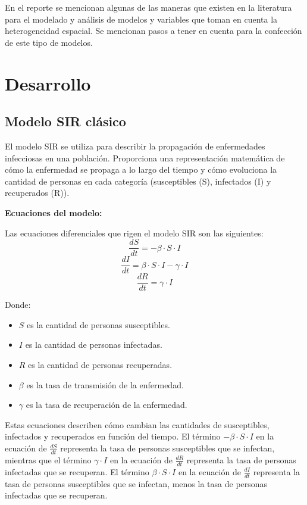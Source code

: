 \documentclass[fleqn,10pt]{SelfArx_063318} %
\begin{document}
En el reporte se mencionan algunas de las maneras que existen en la literatura para el modelado y análisis de
modelos y variables que toman en cuenta la heterogeneidad espacial. Se mencionan pasos a tener en cuenta para la 
confección de este tipo de modelos.

\section{Desarrollo}

\subsection{Modelo SIR clásico}

El modelo SIR se utiliza para describir la propagación de enfermedades infecciosas en una población.
Proporciona una representación matemática de cómo la enfermedad se propaga a lo largo del tiempo y cómo
evoluciona la cantidad de personas en cada categoría (susceptibles (S), infectados (I) y recuperados (R)).

\textbf{Ecuaciones del modelo:}

Las ecuaciones diferenciales que rigen el modelo SIR son las siguientes:
\begin{equation*}
    \frac{dS}{dt} = -\beta \cdot S \cdot I
\end{equation*}
\begin{equation*}
    \frac{dI}{dt} = \beta \cdot S \cdot I - \gamma \cdot I
\end{equation*}
\begin{equation*}
    \frac{dR}{dt} = \gamma \cdot I
\end{equation*}

Donde:
\begin{itemize}
    \item $S$ es la cantidad de personas susceptibles.
    \item $I$ es la cantidad de personas infectadas.
    \item $R$ es la cantidad de personas recuperadas.
    \item $\beta$ es la tasa de transmisión de la enfermedad.
    \item $\gamma$ es la tasa de recuperación de la enfermedad.
\end{itemize}

Estas ecuaciones describen cómo cambian las cantidades de susceptibles, infectados y recuperados en función del tiempo.
El término $-\beta \cdot S \cdot I$ en la ecuación de $\frac{dS}{dt}$ representa la tasa de personas susceptibles que
se infectan, mientras que el término $\gamma \cdot I$ en la ecuación de $\frac{dR}{dt}$ representa la tasa de personas
infectadas que se recuperan. El término $\beta \cdot S \cdot I$ en la ecuación de $\frac{dI}{dt}$ representa la tasa
de personas susceptibles que se infectan, menos la tasa de personas infectadas que se recuperan.
\end{document}
